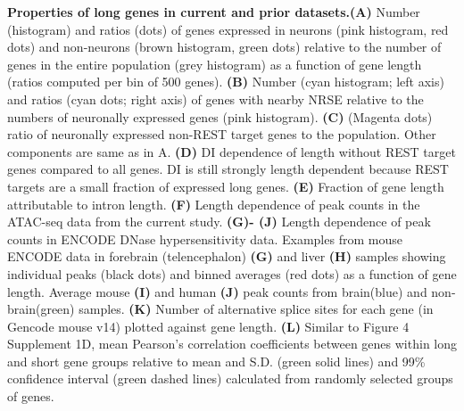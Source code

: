 \textbf{Properties of long genes in current and prior datasets.}\textbf{(A)} Number (histogram) and ratios (dots) of genes expressed in neurons (pink histogram, red dots) and non-neurons (brown histogram, green dots) relative to the number of genes in the entire population (grey histogram) as a function of gene length (ratios computed per bin of 500 genes). 
\textbf{(B)} Number (cyan histogram; left axis) and ratios (cyan dots; right axis) of genes with nearby NRSE relative to the numbers of neuronally expressed genes (pink histogram). 
\textbf{(C)} (Magenta dots) ratio of neuronally expressed non-REST target genes to the population. Other components are same as in A.
\textbf{(D)} DI dependence of length without REST target genes compared to all genes. DI is still strongly length dependent because REST targets are a small fraction of expressed long genes.
\textbf{(E)} Fraction of gene length attributable to intron length.
\textbf{(F)} Length dependence of peak counts in the ATAC-seq data from the current study.
\textbf{(G)- (J)} Length dependence of peak counts in ENCODE DNase hypersensitivity data. Examples from mouse ENCODE data in forebrain (telencephalon) \textbf{(G)} and liver \textbf{(H)} samples showing individual peaks (black dots) and binned averages (red dots) as a function of gene length. Average mouse \textbf{(I)} and human \textbf{(J)} peak counts from brain(blue) and non-brain(green) samples.
\textbf{(K)} Number of alternative splice sites for each gene (in Gencode mouse v14) plotted against gene length.
\textbf{(L)} Similar to Figure 4 Supplement 1D, mean Pearson's correlation coefficients between genes within long and short gene groups relative to mean and S.D. (green solid lines) and 99\% confidence interval (green dashed lines) calculated from randomly selected groups of genes.




